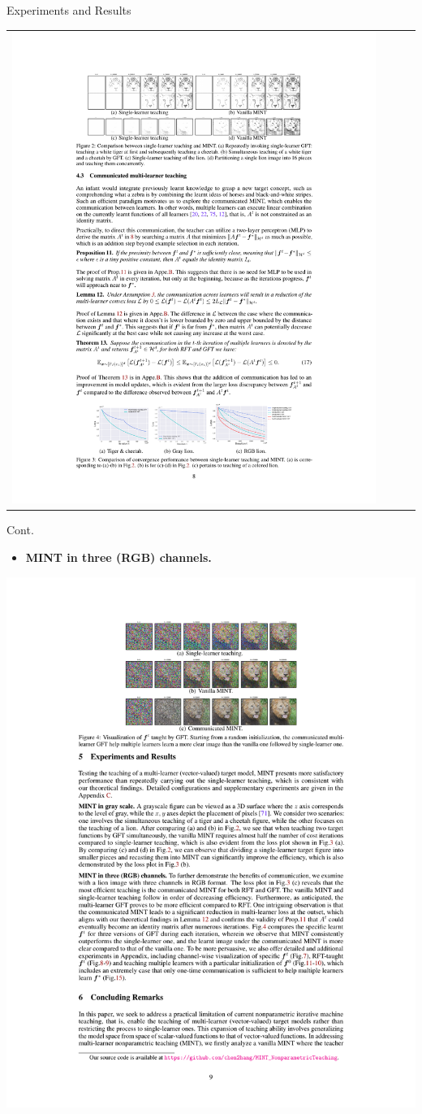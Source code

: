 \documentclass[aspectratio=169,xcolor=dvipsnames]{beamer}
\begin{document}
\begin{frame}{Experiments and Results}
\begin{tabular}{lclc}
\includegraphics[width=0.85\linewidth]{./out/grayLion}\\
\end{tabular}

\end{frame}


\begin{frame}{Cont.}
\begin{itemize}
    \item {\bf  MINT in three (RGB) channels.}
\end{itemize}

\centering
\includegraphics[width=0.7\linewidth]{./out/RGBlion}

\end{frame}
\end{document}
